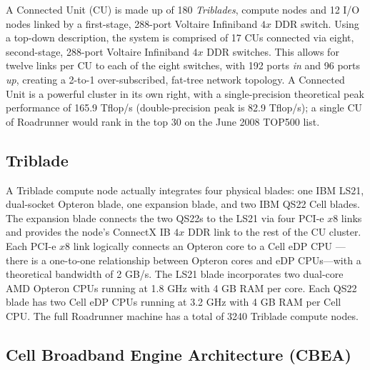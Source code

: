 \documentclass[journal,twoside]{IEEEtran}
\newcommand{\fig}[1]{Figure~\ref{fig:#1}}
\begin{document}
A Connected Unit (CU) is made up of 180 \emph{Triblades}, compute
nodes and 12 I/O nodes linked by a first-stage, 288-port Voltaire
Infiniband $4x$ DDR switch.  Using a top-down description, the system
is comprised of 17 CUs connected via eight, second-stage, 288-port
Voltaire Infiniband $4x$ DDR switches.  This allows for twelve links
per CU to each of the eight switches, with 192 ports
\emph{in} and 96 ports \emph{up}, creating a 2-to-1 over-subscribed,
fat-tree network topology.  A Connected Unit is a powerful cluster in
its own right, with a single-precision theoretical peak performance of
165.9 Tflop/s (double-precision peak is 82.9 Tflop/s); a single CU of
Roadrunner would rank in the top 30 on the June 2008 TOP500 list.

\subsection{Triblade}


A Triblade compute node actually integrates four physical blades: one
IBM LS21, dual-socket Opteron blade, one expansion blade, and two IBM
QS22 Cell blades.  The expansion blade connects the two QS22s to the
LS21 via four PCI-e $x8$ links and provides the node's ConnectX IB
$4x$ DDR link to the rest of the CU cluster.  Each PCI-e $x8$ link
logically connects an Opteron core to a Cell eDP CPU ---there is a
one-to-one relationship between Opteron cores and eDP CPUs---with a
theoretical bandwidth of 2 GB/s.
The LS21 blade incorporates two dual-core AMD Opteron CPUs running at
1.8 GHz with 4 GB RAM per core.  Each QS22 blade has two Cell eDP CPUs
running at 3.2 GHz with 4 GB RAM per Cell CPU.  The full Roadrunner
machine has a total of 3240 Triblade compute nodes.

\subsection{Cell Broadband Engine Architecture (CBEA)}
\end{document}
